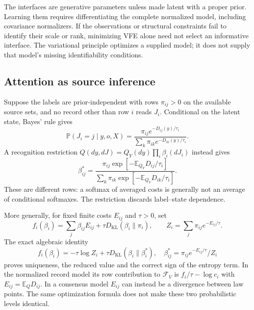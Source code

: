 The interfaces are generative parameters unless made latent with a proper prior. Learning them requires differentiating the complete normalized model, including covariance normalizers. If the observations or structural constraints fail to identify their scale or rank, minimizing VFE alone need not select an informative interface. The variational principle optimizes a supplied model; it does not supply that model's missing identifiability conditions.

\subsection{Attention as source inference}\label{sec:mixture_derivation}
Suppose the labels are prior-independent with rows $\pi_{ij}>0$ on the available source sets, and no record other than row $i$ reads $J_i$. Conditional on the latent state, Bayes' rule gives
\begin{equation}
\mathbb P(J_i=j\mid y,o,X)
=\frac{\pi_{ij}e^{-D_{ij}(y)/\tau_i}}
{\sum_k\pi_{ik}e^{-D_{ik}(y)/\tau_i}}.
\label{eq:generative_source_attention}
\end{equation}
A recognition restriction $Q(dy,dJ)=Q_Y(dy)\prod_i\beta_i(dJ_i)$ instead gives
\begin{equation}
\beta_{ij}^*
=\frac{\pi_{ij}\exp[-\mathbb E_{Q_Y}D_{ij}/\tau_i]}
{\sum_k\pi_{ik}\exp[-\mathbb E_{Q_Y}D_{ik}/\tau_i]}.
\label{eq:recognition_source_attention}
\end{equation}
These are different rows: a softmax of averaged costs is generally not an average of conditional softmaxes. The restriction discards label--state dependence.

More generally, for fixed finite costs $E_{ij}$ and $\tau>0$, set
\begin{equation}
f_i(\beta_i)=\sum_j\beta_{ij}E_{ij}
+\tau D_{\mathrm{KL}}(\beta_i\|\pi_i),\qquad
Z_i=\sum_j\pi_{ij}e^{-E_{ij}/\tau}.
\label{eq:mixture_energy_entropy}
\end{equation}
The exact algebraic identity
\begin{equation}
f_i(\beta_i)=-\tau\log Z_i+\tau D_{\mathrm{KL}}(\beta_i\|\beta_i^*),
\quad
\beta_{ij}^*=\pi_{ij}e^{-E_{ij}/\tau}/Z_i
\label{eq:beta_optimal}
\end{equation}
proves uniqueness, the reduced value and the correct sign of the entropy term. In the normalized record model its row contribution to $\mathcal F_V$ is $f_i/\tau-\log c_i$ with $E_{ij}=\mathbb E_QD_{ij}$. In a consensus model $E_{ij}$ can instead be a divergence between law points. The same optimization formula does not make these two probabilistic levels identical.

